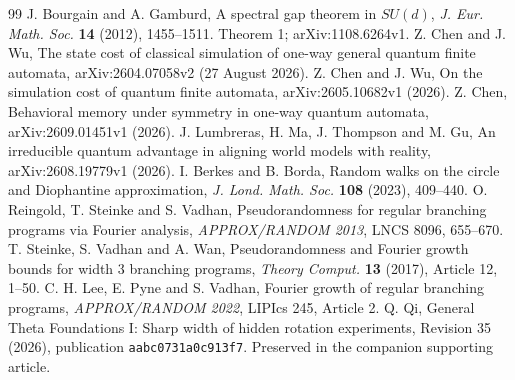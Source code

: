 \begin{thebibliography}{99}
 J. Bourgain and A. Gamburd,
A spectral gap theorem in $SU(d)$,
\emph{J. Eur. Math. Soc.} \textbf{14} (2012), 1455--1511.
Theorem 1; arXiv:1108.6264v1.
 Z. Chen and J. Wu,
The state cost of classical simulation of one-way general quantum finite
automata, arXiv:2604.07058v2 (27 August 2026).
 Z. Chen and J. Wu,
On the simulation cost of quantum finite automata,
arXiv:2605.10682v1 (2026).
 Z. Chen,
Behavioral memory under symmetry in one-way quantum automata,
arXiv:2609.01451v1 (2026).
 J. Lumbreras, H. Ma, J. Thompson and M. Gu,
An irreducible quantum advantage in aligning world models with reality,
arXiv:2608.19779v1 (2026).
 I. Berkes and B. Borda,
Random walks on the circle and Diophantine approximation,
\emph{J. Lond. Math. Soc.} \textbf{108} (2023), 409--440.
 O. Reingold, T. Steinke and S. Vadhan,
Pseudorandomness for regular branching programs via Fourier analysis,
\emph{APPROX/RANDOM 2013}, LNCS 8096, 655--670.
 T. Steinke, S. Vadhan and A. Wan,
Pseudorandomness and Fourier growth bounds for width 3 branching programs,
\emph{Theory Comput.} \textbf{13} (2017), Article 12, 1--50.
 C. H. Lee, E. Pyne and S. Vadhan,
Fourier growth of regular branching programs,
\emph{APPROX/RANDOM 2022}, LIPIcs 245, Article 2.
 Q. Qi,
General Theta Foundations I: Sharp width of hidden rotation experiments,
Revision 35 (2026), publication \texttt{aabc0731a0c913f7}.
Preserved in the companion supporting article.
\end{thebibliography}
